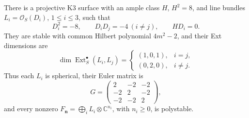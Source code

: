 \begin{theorem}\label{cycompact:thm:triple}
There is a projective K3 surface with an ample class $H$,
$H^2=8$, and line bundles $L_i=\mathcal O_S(D_i)$,
$1\leq i\leq3$, such that
\[
 D_i^2=-8,\qquad D_iD_j=-4\ (i\ne j),\qquad HD_i=0.
\]
They are stable with common Hilbert polynomial $4m^2-2$,
and their Ext dimensions are
\[
 \dim\operatorname{Ext}^{\bullet}_S(L_i,L_j)=
 \begin{cases}(1,0,1),&i=j,\\(0,2,0),&i\ne j.
 \end{cases}
\]
Thus each $L_i$ is spherical, their Euler matrix is
\begin{equation}\label{cycompact:eq:Cartan}
 G=\begin{pmatrix}2&-2&-2\\-2&2&-2\\-2&-2&2\end{pmatrix},
\end{equation}
and every nonzero $F_{\mathbf n}=\bigoplus_iL_i\otimes\mathbb C^{n_i}$,
with $n_i\geq0$, is polystable.
\end{theorem}

